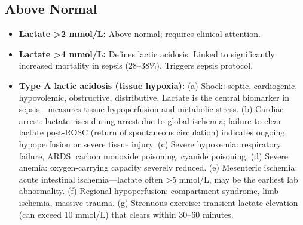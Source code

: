 \subsection*{Above Normal}
\begin{itemize}
  \item \textbf{Lactate >2 mmol/L:} Above normal; requires clinical attention.
  \item \textbf{Lactate >4 mmol/L:} Defines lactic acidosis. Linked to significantly increased mortality in sepsis (28--38\%). Triggers sepsis protocol.
  \item \textbf{Type A lactic acidosis (tissue hypoxia):} (a) Shock: septic, cardiogenic, hypovolemic, obstructive, distributive. Lactate is the central biomarker in sepsis---measures tissue hypoperfusion and metabolic stress. (b) Cardiac arrest: lactate rises during arrest due to global ischemia; failure to clear lactate post-ROSC (return of spontaneous circulation) indicates ongoing hypoperfusion or severe tissue injury. (c) Severe hypoxemia: respiratory failure, ARDS, carbon monoxide poisoning, cyanide poisoning. (d) Severe anemia: oxygen-carrying capacity severely reduced. (e) Mesenteric ischemia: acute intestinal ischemia---lactate often >5 mmol/L, may be the earliest lab abnormality. (f) Regional hypoperfusion: compartment syndrome, limb ischemia, massive trauma. (g) Strenuous exercise: transient lactate elevation (can exceed 10 mmol/L) that clears within 30--60 minutes.

\end{itemize}
